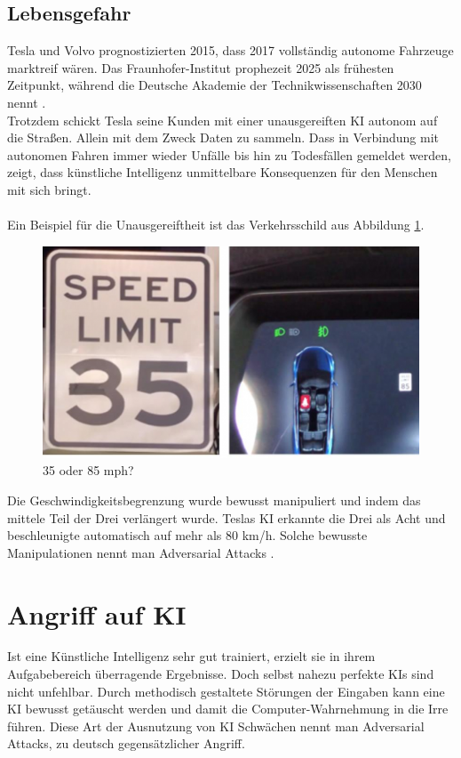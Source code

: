 \documentclass[12pt,oneside,a4paper,parskip]{scrbook}
\begin{document}
\subsection{Lebensgefahr}
Tesla und Volvo prognostizierten 2015, dass 2017 vollständig autonome Fahrzeuge marktreif wären. Das Fraunhofer-Institut prophezeit 2025 als frühesten Zeitpunkt, während die Deutsche Akademie der Technikwissenschaften 2030 nennt \cite{AutonomAuto}.
\\Trotzdem schickt Tesla seine Kunden mit einer unausgereiften KI autonom auf die Straßen. Allein mit dem Zweck Daten zu sammeln. Dass in Verbindung mit autonomen Fahren immer wieder Unfälle bis hin zu Todesfällen gemeldet werden, zeigt, dass künstliche Intelligenz unmittelbare Konsequenzen für den Menschen mit sich bringt. \\\\
Ein Beispiel für die Unausgereiftheit ist das Verkehrsschild aus Abbildung \ref{fig:Verkehrsschild}.  %
\begin{figure}[h]
	\begin{center}
		\includegraphics[width=15cm]{Bilder/Tesla_Adversarial_Attack.png}
		\caption{35 oder 85 mph?}
		\label{fig:Verkehrsschild}
	\end{center}
\end{figure}
Die Geschwindigkeitsbegrenzung wurde bewusst manipuliert und indem das mittele Teil der Drei verlängert wurde. Teslas KI erkannte die Drei als Acht und beschleunigte automatisch auf mehr als 80 km/h. Solche bewusste Manipulationen nennt man Adversarial Attacks \cite{TeslaHack}.
\section{Angriff auf KI}
Ist eine Künstliche Intelligenz sehr gut trainiert, erzielt sie in ihrem Aufgabebereich überragende Ergebnisse. Doch selbst nahezu perfekte KIs sind nicht unfehlbar. Durch methodisch gestaltete Störungen der Eingaben kann eine KI bewusst getäuscht werden und damit die Computer-Wahrnehmung in die Irre führen. Diese Art der Ausnutzung von KI Schwächen nennt man Adversarial Attacks, zu deutsch gegensätzlicher Angriff.
\end{document}

